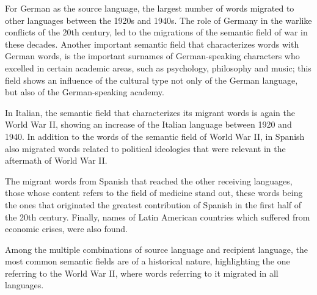 \documentclass[10pt,letterpaper]{article} %
\begin{document}
For German as the source language, the largest number of words migrated to other languages between the 1920s and 1940s. The role of Germany in the warlike conflicts of the 20th century, led to the migrations of the semantic field of war in these decades. Another important semantic field that characterizes words with German words, is the important surnames of German-speaking characters who excelled in certain academic areas, such as psychology, philosophy and music; this field shows an influence of the cultural type not only of the German language, but also of the German-speaking academy.

In Italian, the semantic field that characterizes its migrant words  is again the World War II, showing an increase of the Italian language between 1920 and 1940. In addition to the words of the semantic field of World War II, in Spanish also migrated words related to political ideologies that were relevant in the aftermath of World War II.


The migrant words from Spanish that reached the other receiving languages, those whose content refers to the field of medicine stand out, these words being the ones that originated the greatest contribution of Spanish in the first half of the 20th century. Finally, names of Latin American countries  which suffered from economic crises, were also found.

Among the multiple combinations of source language and recipient language, the most common semantic fields are of a historical nature, highlighting the one referring to the World War II, where words referring to it migrated in all languages.



\end{document}
